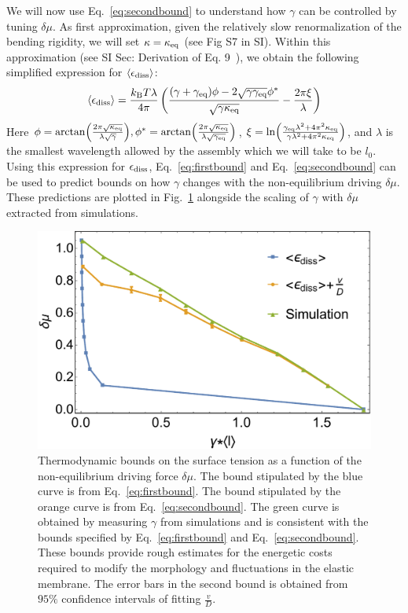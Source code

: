 \documentclass[amsmath,preprintnumbers,10pt,nofootinbib,prl,twocolumn]{revtex4-1}
\begin{document}
We will now use Eq.~\ref{eq:secondbound} to understand how $\gamma$ can be controlled by tuning $\delta \mu$. As first approximation, given the relatively slow renormalization of the bending rigidity, we will set $\kappa=\kappa_{\rm eq}$ (see Fig S7 in SI). Within this approximation (see SI Sec: Derivation of Eq. 9~\cite{Supplementary}), we obtain the following simplified expression for $\langle \epsilon_{\rm diss} \rangle$: 
\begin{equation}
\label{eq:epsilonexpress}
 \langle\epsilon_{\rm diss}\rangle =\frac{k_{\rm B}T\lambda}{4\pi}\left ( \frac{(\gamma + \gamma_{\rm eq})\phi-2\sqrt{\gamma\gamma_{\rm eq}}\phi^*}{\sqrt{\gamma \kappa_{\rm eq}}}-\frac{2\pi \xi}{\lambda} \right)
\end{equation}
Here $\phi=\arctan(\frac{2\pi\sqrt{\kappa_{\rm eq}}}{\lambda\sqrt{\gamma}}), \phi^*=\arctan(\frac{2\pi\sqrt{\kappa_{\rm eq}}}{\lambda\sqrt{\gamma_{\rm{eq}}}})$, $\xi=\ln(\frac{\gamma_{\rm{eq}}\lambda^2+4\pi^2\kappa_{\rm eq}}{\gamma\lambda^2+4\pi^2\kappa_{\rm eq}})$, and $\lambda$ is the smallest wavelength allowed by the assembly which we will take to be $l_0$. Using this expression for $\epsilon_{\rm diss}$, Eq.~\ref{eq:firstbound} and Eq.~\ref{eq:secondbound} can be used to predict bounds on how $\gamma$ changes with the non-equilibrium driving $\delta \mu$. These predictions are plotted in Fig.~\ref{fig:PhaseDiagram} alongside the scaling of $\gamma$ with $\delta \mu$ extracted from simulations. 

\begin{figure}[tbb]
\centering
\includegraphics[scale=0.38]{Fig6.pdf}
\caption{Thermodynamic bounds on the surface tension as a function of the non-equilibrium driving force $\delta\mu$. The bound stipulated by the blue curve is from Eq.~\ref{eq:firstbound}. The bound stipulated by the orange curve is from Eq.~\ref{eq:secondbound}. The green curve is obtained by measuring $\gamma$ from simulations and is consistent with the bounds specified by Eq.~\ref{eq:firstbound} and Eq.~\ref{eq:secondbound}. These bounds provide rough estimates for the energetic costs required to modify the morphology and fluctuations in the elastic membrane. The error bars in the second bound is obtained from $95\%$ confidence intervals of fitting $\frac{v}{D}$.}\label{fig:PhaseDiagram}
\end{figure}
\end{document}
